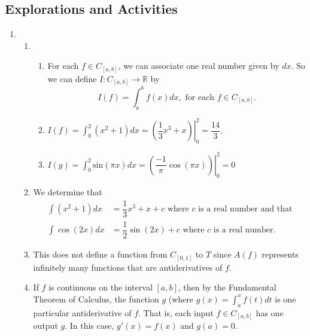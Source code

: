 \subsection*{Explorations and Activities}
\setcounter{oldenumi}{\theenumi}
\begin{enumerate} \setcounter{enumi}{\theoldenumi}
\item \begin{enumerate}
\item \begin{enumerate}
\item For each  $f \in C_{\left[ {a, b} \right]} $, we can associate one real number given by 
$ dx$.  So we can define  $I:C_{\left[ {a, b} \right]}  \to \mathbb{R}$
by
\[
I\left( f \right) =  \int_a^b {f\left( x \right) dx}, \text{ for each }  
f \in C_{\left[ {a, b} \right]}.
\]

\item $I \left( f \right) =\int_0^2 {\left( x^2+1 \right)}  dx = \left. {\left( {\dfrac{1}{3}x^3  + x} \right)} \right|_0^2  = \dfrac{{14}}{3}$.

\item $I\left( g \right) = \int_0^2 \text{sin} \left( \pi x \right) dx = 
\left. {\left( {\dfrac{{ - 1}}{\pi }\cos \left( {\pi x} \right)} \right)} \right|_0^2  = 0$
\end{enumerate}

\item We determine that
\begin{align*}
\int {\left( {x^2  + 1} \right) dx} &= \dfrac{1}{3}x^3  + x + c  \text{ where } c 
\text{ is a real number and that} \\
\int {\cos \left( 2x \right) dx} &= \dfrac{1}{2}\sin \left( 2x \right) + c 
\text{ where } c  \text{ is a real number}.
\end{align*}
 

\item This does not define a function from  $C_{\left[ {0, 1} \right]} $ to  $T$  since  
$A\left( f \right)$ represents infinitely many functions that are antiderivatives of  $f$.

\item If  $f$  is continuous on the interval  $\left[ {a, b} \right]$, then by the Fundamental Theorem of Calculus,  the function  $g$  (where  
$g\left( x \right) =  \int_a^x {f\left( t \right) dt}$ is one particular antiderivative of  $f$.  That is, each input  $f \in C_{\left[ {a, b} \right]} $  has one output  $g$.  In this case,  $g'\left( x \right) = f\left( x \right)$  and  $g\left( a \right) = 0$.




\end{enumerate}
\end{enumerate}
\hbreak

\endinput
